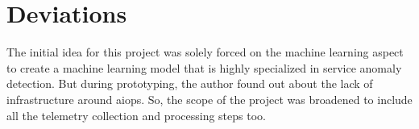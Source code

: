 \section{Deviations}

The initial idea for this project was solely forced on the machine learning aspect to create a machine learning model that is highly specialized in service anomaly detection. But during prototyping, the author found out about the lack of infrastructure around \ac{aiops}. So, the scope of the project was broadened to include all the telemetry collection and processing steps too.